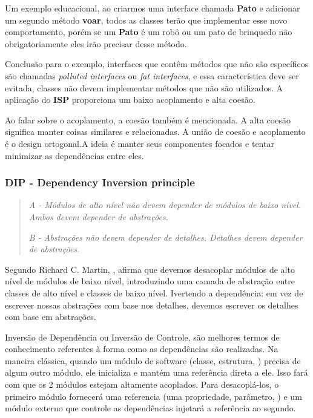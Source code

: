 \documentclass[12pt]{article}
\begin{document}
Um exemplo educacional, ao criarmos uma interface chamada \textbf{Pato} e adicionar um segundo método \textbf{voar}, todos as classes terão que implementar esse novo comportamento, porém se um \textbf{Pato} é um robô ou um pato de brinquedo não obrigatoriamente eles irão precisar desse método.

Conclusão para o exemplo, interfaces que contêm métodos que não são específicos são chamadas \textit{polluted interfaces} ou \textit{fat interfaces}, e essa característica deve ser evitada, classes não devem implementar métodos que não são utilizados. A aplicação do \textbf{ISP} proporciona um baixo acoplamento e alta coesão.

Ao falar sobre o acoplamento, a coesão também é mencionada. A alta coesão significa manter coisas similares e relacionadas. A união de coesão e acoplamento é o design ortogonal.A ideia é manter seus componentes focados e tentar minimizar as dependências entre eles.

\subsubsection{DIP - Dependency Inversion principle}
\begin{quote}
	\textit{A - Módulos de alto nível não devem depender de módulos de baixo nível. Ambos devem depender de abstrações.}
	
	\textit{B -  Abstrações não devem depender de detalhes. Detalhes devem depender de abstrações.}	
\end{quote}

Segundo Richard C. Martin, \cite{ROBERT_MARTIN_THE_CLEAN_ARCHITECTURE}, afirma que devemos desacoplar módulos de alto nível de módulos de baixo nível, introduzindo uma camada de abstração entre classes de alto nível e classes de baixo nível. Ivertendo a dependência: em vez de escrever nossas abstrações com base nos detalhes, devemos escrever os detalhes com base em abstrações.

Inversão de Dependência ou Inversão de Controle, são melhores termos de conhecimento referentes à forma como as dependências são realizadas. Na maneira clássica, quando um módulo de software (classe, estrutura, ) precisa de algum outro módulo, ele inicializa e mantém uma referência direta a ele. Isso fará com que os 2 módulos estejam altamente acoplados. Para desacoplá-los, o primeiro módulo fornecerá uma referencia (uma propriedade, parâmetro, ) e um módulo externo que controle as dependências injetará a referência ao segundo.
\end{document}
